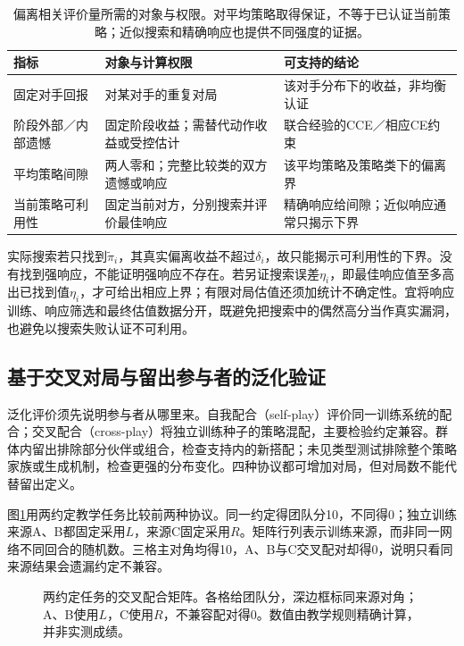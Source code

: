 \begin{table}[htbp]
 \centering
 \begin{tabularx}{\linewidth}{@{}l >{\raggedright\arraybackslash}X >{\raggedright\arraybackslash}X@{}}
 \toprule
 指标 & 对象与计算权限 & 可支持的结论\\
 \midrule
 固定对手回报 & 对某对手的重复对局 & 该对手分布下的收益，非均衡认证\\
 阶段外部／内部遗憾 & 固定阶段收益；需替代动作收益或受控估计 & 联合经验的CCE／相应CE约束\\
 平均策略间隙 & 两人零和；完整比较类的双方遗憾或响应 & 该平均策略及策略类下的偏离界\\
 当前策略可利用性 & 固定当前对方，分别搜索并评价最佳响应 & 精确响应给间隙；近似响应通常只揭示下界\\
 \bottomrule
 \end{tabularx}
 \caption{偏离相关评价量所需的对象与权限。对平均策略取得保证，不等于已认证当前策略；近似搜索和精确响应也提供不同强度的证据。}
 \label{tab:rl-multi-agent-guarantees}
\end{table}

实际搜索若只找到$\tilde\pi_i$，其真实偏离收益不超过$\delta_i$，故只能揭示可利用性的下界。没有找到强响应，不能证明强响应不存在。若另证搜索误差$\eta_i$，即最佳响应值至多高出已找到值$\eta_i$，才可给出相应上界；有限对局估值还须加统计不确定性。宜将响应训练、响应筛选和最终估值数据分开，既避免把搜索中的偶然高分当作真实漏洞，也避免以搜索失败认证不可利用。

\subsection{基于交叉对局与留出参与者的泛化验证}
\label{sec:rl-multi-agent-cross-play}

泛化评价须先说明参与者从哪里来。自我配合（self-play）评价同一训练系统的配合；交叉配合（cross-play）将独立训练种子的策略混配，主要检验约定兼容。群体内留出排除部分伙伴或组合，检查支持内的新搭配；未见类型测试排除整个策略家族或生成机制，检查更强的分布变化。四种协议都可增加对局，但对局数不能代替留出定义。

图\ref{fig:rl-multi-agent-cross-play}用两约定教学任务比较前两种协议。同一约定得团队分10，不同得0；独立训练来源A、B都固定采用$L$，来源C固定采用$R$。矩阵行列表示训练来源，而非同一网络不同回合的随机数。三格主对角均得10，A、B与C交叉配对却得0，说明只看同来源结果会遗漏约定不兼容。

\begin{figure}[htbp]
 \centering
 
 \caption{两约定任务的交叉配合矩阵。各格给团队分，深边框标同来源对角；A、B使用$L$，C使用$R$，不兼容配对得0。数值由教学规则精确计算，并非实测成绩。}
 \label{fig:rl-multi-agent-cross-play}
\end{figure}

